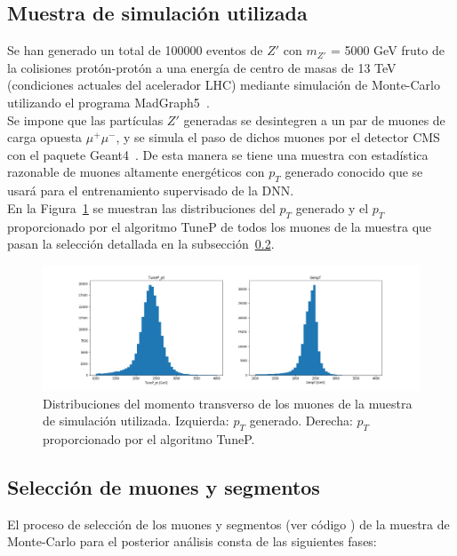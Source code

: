 \subsection{Muestra de simulaci\'on utilizada}\label{sec:sample}

Se han generado un total de 100000 eventos de $Z'$ con $m_{Z'}$ = 5000 GeV fruto de la colisiones prot\'on-prot\'on a una energ\'ia de centro de masas de 13 TeV (condiciones actuales del acelerador LHC) mediante simulaci\'on de Monte-Carlo utilizando el programa MadGraph5~\cite{Alwall:2014hca}. \\
Se impone que las part\'iculas $Z'$ generadas se desintegren a un par de muones de carga opuesta $\mu^{+}\mu^{-}$, y se simula el paso de dichos muones por el detector CMS con el paquete Geant4~\cite{Agostinelli:2002hh}. De esta manera se tiene una muestra con estad\'istica razonable de muones altamente energ\'eticos con $p_{T}$ generado conocido que se usar\'a para el entrenamiento supervisado de la DNN. \\

En la Figura~\ref{fig:data_pt} se muestran las distribuciones del $p_{T}$ generado y el $p_{T}$ proporcionado por el algoritmo TuneP de todos los muones de la muestra que pasan la selecci\'on detallada en la subsecci\'on~\ref{sec:selection}.

\begin{figure}[h]
\centering
\includegraphics[width=1.0\textwidth]{figures/data_pt.png}
\caption{Distribuciones del momento transverso de los muones de la muestra de simulaci\'on utilizada. Izquierda: $p_{T}$ generado. Derecha: $p_{T}$ proporcionado por el algoritmo TuneP.}
\label{fig:data_pt}        
\end{figure}


\subsection{Selecci\'on de muones y segmentos}\label{sec:selection}

El proceso de selecci\'on de los muones y segmentos (ver c\'odigo \cite{analyzer}) de la muestra de Monte-Carlo para el posterior an\'alisis consta de las siguientes fases: 

